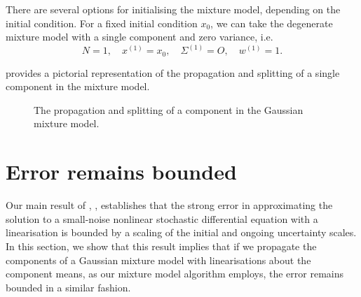 There are several options for initialising the mixture model, depending on the initial condition.
For a fixed initial condition \(x_0\), we can take the degenerate mixture model with a single component and zero variance, i.e.
\[
	N = 1, \quad x^{(1)} = x_0, \quad \Sigma^{(1)} = O, \quad w^{(1)} = 1.
\]



 provides a pictorial representation of the propagation and splitting of a single component in the mixture model.


\begin{figure}
	\begin{center}
		
		\caption{The propagation and splitting of a component in the Gaussian mixture model.}
		\label{fig:gmm_steps}
	\end{center}
\end{figure}


\section{Error remains bounded}
Our main result of , , establishes that the strong error in approximating the solution to a small-noise nonlinear stochastic differential equation with a linearisation is bounded by a scaling of the initial and ongoing uncertainty scales.
In this section, we show that this result implies that if we propagate the components of a Gaussian mixture model with linearisations about the component means, as our mixture model algorithm employs, the error remains bounded in a similar fashion.

